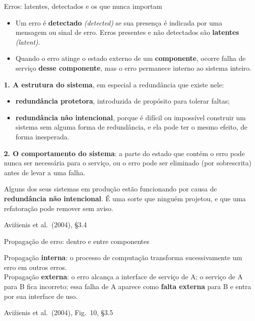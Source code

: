\documentclass{beamer}
\newcommand{\en}[1]{{\color{depCinza}\textit{#1}}}
\newcommand{\sect}[1]{\par\smallskip\hfill{\tiny\color{black!55}Avi\v{z}ienis et al.\ (2004), #1}}
\begin{document}
\begin{frame}{Erros: latentes, detectados e os que nunca importam}
    \footnotesize
    \begin{itemize}
        \item Um erro \'e \textbf{detectado} \en{(detected)} se sua presen\c{c}a \'e indicada por uma mensagem ou sinal de erro. Erros presentes e n\~ao detectados s\~ao \textbf{latentes} \en{(latent)}.
        \item Quando o erro atinge o estado externo de um \textbf{componente}, ocorre falha de servi\c{c}o \textbf{desse componente}, mas o erro permanece interno ao sistema inteiro.
    \end{itemize}
    \medskip
    \begin{defi}
        \scriptsize
        \textbf{1. A estrutura do sistema}, em especial a redund\^ancia que existe nele:
        \begin{itemize}
            \item \textbf{redund\^ancia protetora}, introduzida de prop\'osito para tolerar faltas;
            \item \textbf{redund\^ancia n\~ao intencional}, porque \'e dif\'icil ou imposs\'ivel construir um sistema sem alguma forma de redund\^ancia, e ela pode ter o mesmo efeito, de forma inesperada.
        \end{itemize}
        \textbf{2. O comportamento do sistema}: a parte do estado que cont\'em o erro pode nunca ser necess\'aria para o servi\c{c}o, ou o erro pode ser eliminado (por sobrescrita) antes de levar a uma falha.
    \end{defi}
    \medskip
    \begin{ancora}
        \footnotesize
        Alguns dos seus sistemas em produ\c{c}\~ao est\~ao funcionando por causa de \textbf{redund\^ancia n\~ao intencional}. \'E uma sorte que ningu\'em projetou, e que uma refatora\c{c}\~ao pode remover sem aviso.
    \end{ancora}
    \sect{\S3.4}
\end{frame}

\begin{frame}{Propaga\c{c}\~ao de erro: dentro e entre componentes}
    \centering
    \diagPropagacao
    \vspace{0.1em}
    \begin{ancora}
        \scriptsize
        Propaga\c{c}\~ao \textbf{interna}: o processo de computa\c{c}\~ao transforma sucessivamente um erro em outros erros.\\
        Propaga\c{c}\~ao \textbf{externa}: o erro alcan\c{c}a a interface de servi\c{c}o de A; o servi\c{c}o de A para B fica incorreto; essa falha de A aparece como \textbf{falta externa} para B e entra por sua interface de uso.
    \end{ancora}
    \sect{Fig.\ 10, \S3.5}
\end{frame}
\end{document}
